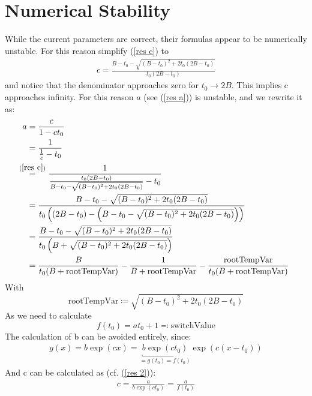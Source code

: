 \documentclass[11pt, a4paper]{article}
\makeatletter
\newcommand*{\sm@shstack}[3][lr]{
	\mathrel{%
		\smashoperator[#1]{\mathop{#2}^{#3}}}
}
\newcommand*{\lx@rrow}[2]{ %
	\sm@shstack[l]{#2}{#1}
}
\newcommand*{\lxeq}[1]{\lx@rrow{#1}{=}} %
\makeatother
\begin{document}
    \section{Numerical Stability}
    While the current parameters are correct, their formulas appear to be numerically unstable. For this reason simplify (\ref{res c}) to
    \begin{align}
        c= \frac{B-t_0 - \sqrt{(B-t_0)^2 + 2 t_0(2B - t_0)}}{t_0 (2B -t_0)}
    \end{align}
    and notice that the denominator approaches zero for \(t_0 \to 2B\). This implies c approaches infinity. For this reason \(a\) (see (\ref{res a})) is unstable, and we rewrite it as:
    \begin{align*}
        a &= \frac{c}{1-ct_0}\\
        &= \frac{1}{\frac{1}{c} - t_0}\\
        &\lxeq{(\ref{res c})} \frac{1}{
            \frac{t_0 (2B -t_0)}{B-t_0 - \sqrt{(B-t_0)^2 + 2 t_0(2B - t_0)}} 
            - t_0
        }\\
        & = \frac{B-t_0 - \sqrt{(B-t_0)^2 + 2 t_0(2B - t_0)}}{t_0 \left(
            (2B -t_0)
            - \left(B-t_0 - \sqrt{(B-t_0)^2 + 2 t_0(2B - t_0)}\right) \right)
        }\\
        & = \frac{B-t_0 - \sqrt{(B-t_0)^2 + 2 t_0(2B - t_0)}}{t_0 \left(
            B + \sqrt{(B-t_0)^2 + 2 t_0(2B - t_0)} \right)
        }\\ 
        &= \frac{B}{t_0(B + \text{rootTempVar})} - \frac{1}{B + \text{rootTempVar}} - \frac{\text{rootTempVar}}{t_0(B + \text{rootTempVar})}
    \end{align*}
    With 
    \[
        \text{rootTempVar} \coloneqq \sqrt{(B-t_0)^2 + 2 t_0(2B - t_0)}
    \]
    As we need to calculate
    \[
        f(t_0) = a t_0 +1 \eqqcolon \text{switchValue}
    \]
    The calculation of b can be avoided entirely, since:
    \begin{align*}
        g(x) = b \exp(c x) = \underbracket{b \exp(c t_0)}_{=g(t_0)=f(t_0)}\exp(c(x-t_0))
    \end{align*}
    And c can be calculated as (cf. (\ref{res 2})):
    \begin{align*}
        c = \frac{a}{b \exp(c t_0)} = \frac{a}{f(t_0)}
    \end{align*}
    \clearpage
\end{document}
